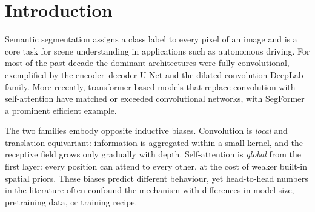 \documentclass[11pt,a4paper]{article}
\begin{document}
\tableofcontents
\newpage

\begin{abstract}
This project presents a controlled comparison of a convolutional and a
transformer-based architecture for semantic segmentation, how each model 
combines information across the image --- local convolution versus global 
self-attention --- while holding the data, training pipeline, parameter count,
and pretraining as constant as possible. A U-Net with a ResNet-34 encoder
($\sim$24M parameters) and SegFormer with a MiT-B2 encoder ($\sim$27M
parameters) are trained on the CamVid driving-scene dataset under an identical
regime and compared along several axes: accuracy, data efficiency, robustness
to input corruptions, boundary quality, and cross-dataset generalization.
Averaged over three seeds, SegFormer outperforms U-Net
($0.798 \pm 0.002$ versus $0.765 \pm 0.007$ mean IoU), with the advantage
on thin and context-dependent classes. SegFormer is also more
data-efficient, matching U-Net's full-data accuracy using only 25\% of the
training images, substantially more robust to corruption (66.5\% versus 54.3\%
mIoU retained at maximum severity), and generalizes markedly better to an
unseen dataset: transferred zero-shot to Cityscapes the accuracy gap widens to
$+0.128$ mIoU, more than three times the in-domain gap. Across every axis the
transformer's advantage grows with the difficulty of the condition,
illustrating how the inductive biases of the two architecture families
performs on a small, class-imbalanced benchmark.
\end{abstract}

\section{Introduction}

Semantic segmentation assigns a class label to every pixel of an image and is
a core task for scene understanding in applications such as autonomous driving.
For most of the past decade the dominant architectures were fully
convolutional, exemplified by the encoder--decoder U-Net and the
dilated-convolution DeepLab family. More recently, transformer-based models
that replace convolution with self-attention have matched or exceeded
convolutional networks, with SegFormer a prominent efficient example.

The two families embody opposite inductive biases. Convolution is \emph{local}
and translation-equivariant: information is aggregated within a small kernel,
and the receptive field grows only gradually with depth. Self-attention is
\emph{global} from the first layer: every position can attend to every other,
at the cost of weaker built-in spatial priors. These biases predict different
behaviour, yet head-to-head numbers in the literature often confound the
mechanism with differences in model size, pretraining data, or training recipe.
\end{document}
